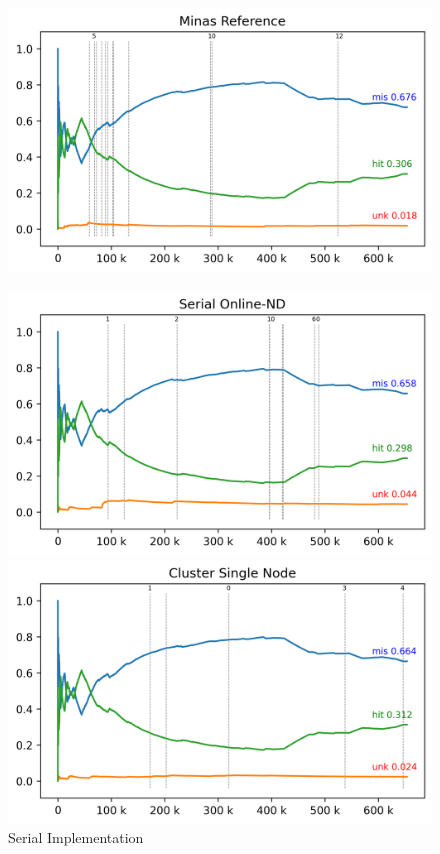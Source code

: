 \begin{figure}[htb]
  \centering
  \begin{minipage}{0.48\textwidth}
    \centering
    \includegraphics[width=1\linewidth]{experiments/revised-java.log.png}
    \label{fig:validation-sub-java}
  \end{minipage}
  \hfill
  \begin{minipage}{0.48\textwidth}
    \centering
    \includegraphics[width=1\linewidth]{experiments/online-nd.log.png}
    \caption{Serial Implementation}
    \label{fig:validation-sub-serial}
  \end{minipage}
  \vspace{5mm}
  \begin{minipage}{0.48\textwidth}
    \centering
    \includegraphics[width=1\linewidth]{experiments/tmi-base.log.png}

\end{minipage}
\end{figure}
